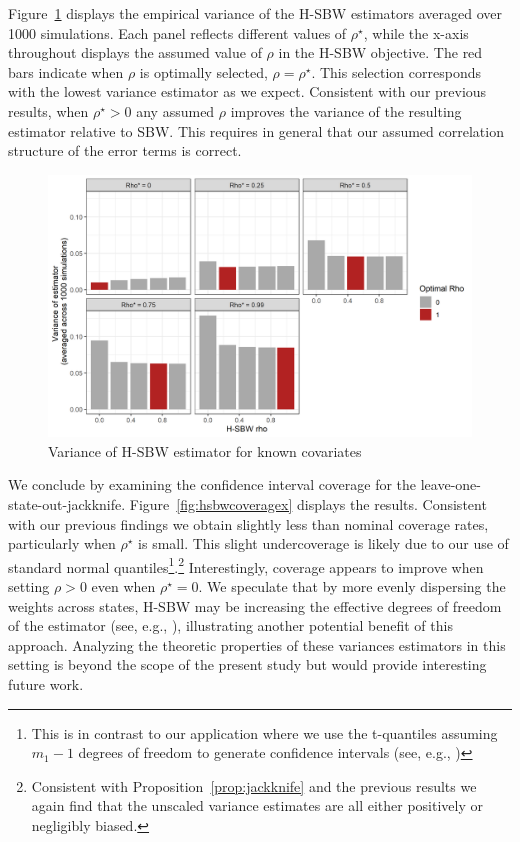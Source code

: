 Figure~\ref{fig:hsbwvarx} displays the empirical variance of the H-SBW estimators averaged over 1000 simulations. Each panel reflects different values of $\rho^\star$, while the x-axis throughout displays the assumed value of $\rho$ in the H-SBW objective. The red bars indicate when $\rho$ is optimally selected, $\rho = \rho^\star$. This selection corresponds with the lowest variance estimator as we expect. Consistent with our previous results, when $\rho^\star > 0$ any assumed $\rho$ improves the variance of the resulting estimator relative to SBW. This requires in general that our assumed correlation structure of the error terms is correct.

\begin{figure}[H]
\begin{center}
    \caption{Variance of H-SBW estimator for known covariates}\label{fig:hsbwvarx}
    \includegraphics[scale=0.5]{01_Plots/variance-x-plot.png}
\end{center}
\end{figure}

We conclude by examining the confidence interval coverage for the leave-one-state-out-jackknife. Figure~\ref{fig:hsbwcoveragex} displays the results. Consistent with our previous findings we obtain slightly less than nominal coverage rates, particularly when $\rho^\star$ is small. This slight undercoverage is likely due to our use of standard normal quantiles\footnote{This is in contrast to our application where we use the t-quantiles assuming $m_1 - 1$ degrees of freedom to generate confidence intervals (see, e.g., \cite{cameron2015practitioner})}.\footnote{Consistent with Proposition~\ref{prop:jackknife} and the previous results we again find that the unscaled variance estimates are all either positively or negligibly biased.} Interestingly, coverage appears to improve when setting $\rho > 0$ even when $\rho^\star = 0$. We speculate that by more evenly dispersing the weights across states, H-SBW may be increasing the effective degrees of freedom of the estimator (see, e.g., \cite{cameron2015practitioner}), illustrating another potential benefit of this approach. Analyzing the theoretic properties of these variances estimators in this setting is beyond the scope of the present study but would provide interesting future work.

